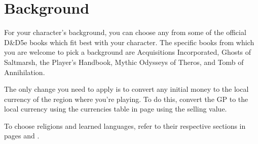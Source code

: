 \section{Background}
\begin{linenumbers}
For your character's background, you can choose any from some of the official D\&D5e books which fit best with your character.
The specific books from which you are welcome to pick a background are Acquisitions Incorporated, Ghosts of Saltmarsh, the Player's Handbook, Mythic Odysseys of Theros, and Tomb of Annihilation.

The only change you need to apply is to convert any initial money to the local currency of the region where you're playing.
To do this, convert the GP to the local currency using the currencies table in page \pageref{sec::currency} using the selling value.

To choose religions and learned languages, refer to their respective sections in pages \pageref{ssec::religions} and \pageref{ssec::languages}.
\end{linenumbers}
